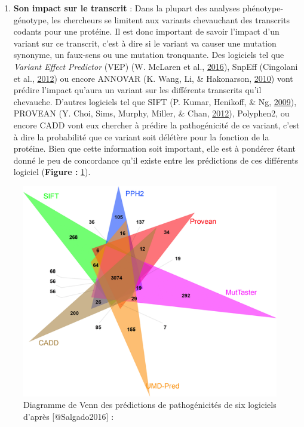 \documentclass[12pt,twoside]{reedthesis}
\providecommand{\tightlist}{%
  \setlength{\itemsep}{0pt}\setlength{\parskip}{0pt}}
\theoremstyle{definition}
\theoremstyle{definition}
\theoremstyle{remark}
\begin{document}
  \begin{enumerate}
  \def\labelenumi{\alph{enumi}.}
  \setcounter{enumi}{2}
  \tightlist
  \item
    \textbf{Son impact sur le transcrit} : Dans la plupart des analyses
    phénotype-génotype, les chercheurs se limitent aux variants
    chevauchant des transcrits codants pour une protéine. Il est donc
    important de savoir l'impact d'un variant sur ce transcrit, c'est à
    dire si le variant va causer une mutation synonyme, un faux-sens ou
    une mutation tronquante. Des logiciels tel que \emph{Variant Effect
    Predictor} (VEP) (W. McLaren et al.,
    \protect\hyperlink{ref-McLaren2016}{2016}), SnpEff (Cingolani et al.,
    \protect\hyperlink{ref-Cingolani2012}{2012}) ou encore ANNOVAR (K.
    Wang, Li, \& Hakonarson, \protect\hyperlink{ref-Wang2010}{2010}) vont
    prédire l'impact qu'aura un variant sur les différents transcrits
    qu'il chevauche. D'autres logiciels tel que SIFT (P. Kumar, Henikoff,
    \& Ng, \protect\hyperlink{ref-Kumar2009}{2009}), PROVEAN (Y. Choi,
    Sims, Murphy, Miller, \& Chan,
    \protect\hyperlink{ref-Choi2012}{2012}), Polyphen2, ou encore CADD
    vont eux chercher à prédire la pathogénicité de ce variant, c'est à
    dire la probabilité que ce variant soit délétère pour la fonction de
    la protéine. Bien que cette information soit important, elle est à
    pondérer étant donné le peu de concordance qu'il existe entre les
    prédictions de ces différents logiciel (\textbf{Figure :}
    \ref{fig:vennpred}).
  \end{enumerate}
  
  \begin{figure}
  
  {\centering \includegraphics[scale=.7]{figure/venn_Diag_patho_pred} 
  
  }
  
  \caption[Diagramme de Venn des prédictions de pathogénicités de six logiciels]{Diagramme de Venn des prédictions de pathogénicités de six logiciels d'après [@Salgado2016] : }\label{fig:vennpred}
  \end{figure}
  
\end{document}
